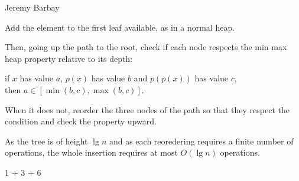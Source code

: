 \begin{enumerate}
\begin{solution}
  \begin{authorship}Jeremy Barbay\end{authorship}
  Add the element to the first leaf available, as in a normal heap.

  Then, going up the path to the root, check if each node respects the
  min max heap property relative to its depth:
  \begin{center}
    if $x$ has value $a$, $p(x)$ has value $b$ and $p(p(x))$ has value
    $c$, \\
    then $a\in[\min(b,c),\max(b,c)]$.
  \end{center}
  When it does not, reorder the three nodes of the path so that they
  respect the condition and check the property upward.

  As the tree is of height $\lg n$ and as each reoredering requires a
  finite number of operations, the whole insertion requires at most
  $O(\lg n)$ operations.
\end{solution}

\end{enumerate}

\begin{spaceForAnswer}\pagebreak\end{spaceForAnswer}

\begin{markingScheme}
1 + 3 + 6
\end{markingScheme}
